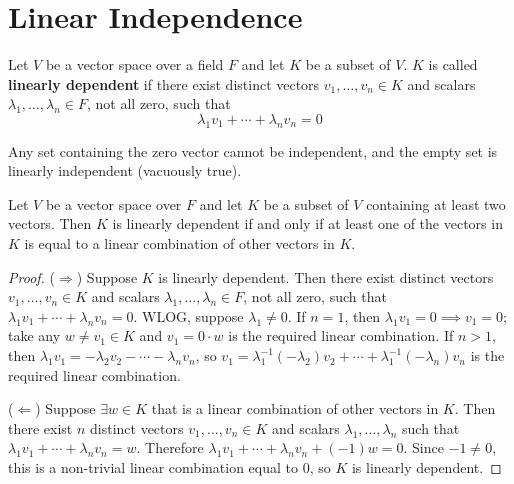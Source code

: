 
\section{Linear Independence}

\begin{definition}\label{def:linear-independence}
    Let $V$ be a vector space over a field $F$ and let $K$ be a subset of $V$. 
    $K$ is called \textbf{linearly dependent} if there exist distinct vectors $v_1, \ldots, v_n \in K$ and scalars $\lambda_1, \ldots, \lambda_n \in F$, not all zero, such that
        \[
        \lambda_1 v_1 + \cdots + \lambda_n v_n = 0
        \]
\end{definition}

\begin{note}
    Any set containing the zero vector cannot be independent, and the empty set is linearly independent (vacuously true).
\end{note}

\begin{theorem}\label{thm:linear-dependence-characterization}
    Let $V$ be a vector space over $F$ and let $K$ be a subset of $V$ containing at least two vectors. Then $K$ is linearly dependent if and only if at least one of the vectors in $K$ is equal to a linear combination of other vectors in $K$.
\end{theorem}

\begin{proof}
    ($\Rightarrow$) Suppose $K$ is linearly dependent. Then there exist distinct vectors $v_1, \ldots, v_n \in K$ and scalars $\lambda_1, \ldots, \lambda_n \in F$, not all zero, such that $\lambda_1 v_1 + \cdots + \lambda_n v_n = 0$. WLOG, suppose $\lambda_1 \neq 0$. If $n = 1$, then $\lambda_1 v_1 = 0 \implies v_1 = 0$; take any $w \neq v_1 \in K$ and $v_1 = 0 \cdot w$ is the required linear combination. If $n > 1$, then $\lambda_1 v_1 = -\lambda_2 v_2 - \cdots - \lambda_n v_n$, so $v_1 = \lambda_1^{-1}(-\lambda_2) v_2 + \cdots + \lambda_1^{-1}(-\lambda_n) v_n$ is the required linear combination.
    
    ($\Leftarrow$) Suppose $\exists w \in K$ that is a linear combination of other vectors in $K$. Then there exist $n$ distinct vectors $v_1, \ldots, v_n \in K$ and scalars $\lambda_1, \ldots, \lambda_n$ such that $\lambda_1 v_1 + \cdots + \lambda_n v_n = w$. Therefore $\lambda_1 v_1 + \cdots + \lambda_n v_n + (-1)w = 0$. Since $-1 \neq 0$, this is a non-trivial linear combination equal to $0$, so $K$ is linearly dependent.
\end{proof}